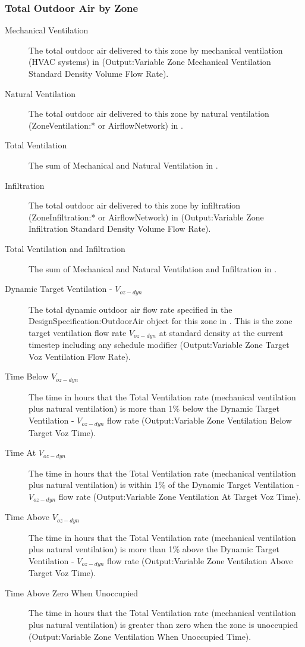 \subsubsection{Total Outdoor Air by Zone}\label{total-outdoor-air-by-zone}
\begin{description}
  \item[Mechanical Ventilation] The total outdoor air delivered to this zone by mechanical ventilation (HVAC systems) in \si{\volume} (Output:Variable Zone Mechanical Ventilation Standard Density Volume Flow Rate).

  \item[Natural Ventilation] The total outdoor air delivered to this zone by natural ventilation (ZoneVentilation:* or AirflowNetwork) in \si{\volume}.

  \item[Total Ventilation] The sum of Mechanical and Natural Ventilation in \si{\volume}.

  \item[Infiltration] The total outdoor air delivered to this zone by infiltration (ZoneInfiltration:* or AirflowNetwork) in \si{\volume} (Output:Variable Zone Infiltration Standard Density Volume Flow Rate).

  \item[Total Ventilation and Infiltration] The sum of Mechanical and Natural Ventilation and Infiltration in \si{\volume}.

  \item[Dynamic Target Ventilation - \(V_{oz-dyn}\)] The total dynamic outdoor air flow rate specified in the DesignSpecification:OutdoorAir object for this zone in \si{\volumeFlowRate}. This is the zone target ventilation flow rate \(V_{oz-dyn}\) at standard density at the current timestep including any schedule modifier (Output:Variable Zone Target Voz Ventilation Flow Rate).

  \item[Time Below \(V_{oz-dyn}\)] The time in hours that the Total Ventilation rate (mechanical ventilation plus natural ventilation) is more than 1\% below the Dynamic Target Ventilation - \(V_{oz-dyn}\) flow rate (Output:Variable Zone Ventilation Below Target Voz Time).

  \item[Time At \(V_{oz-dyn}\)] The time in hours that the Total Ventilation rate (mechanical ventilation plus natural ventilation) is within 1\% of the Dynamic Target Ventilation - \(V_{oz-dyn}\) flow rate (Output:Variable Zone Ventilation At Target Voz Time).

  \item[Time Above \(V_{oz-dyn}\)] The time in hours that the Total Ventilation rate (mechanical ventilation plus natural ventilation) is more than 1\% above the Dynamic Target Ventilation - \(V_{oz-dyn}\) flow rate (Output:Variable Zone Ventilation Above Target Voz Time).

  \item[Time Above Zero When Unoccupied] The time in hours that the Total Ventilation rate (mechanical ventilation plus natural ventilation) is greater than zero when the zone is unoccupied (Output:Variable Zone Ventilation When Unoccupied Time).
\end{description}

